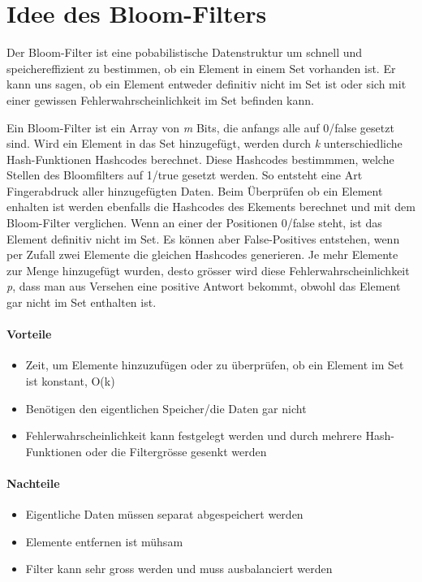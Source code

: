 \documentclass[12pt]{article}
\begin{document}
\maketitle

\section{Idee des Bloom-Filters}
Der Bloom-Filter ist eine pobabilistische Datenstruktur um schnell und speichereffizient zu bestimmen, ob ein Element in einem Set vorhanden ist. Er kann uns sagen, ob ein Element entweder definitiv nicht im Set ist oder sich mit einer gewissen Fehlerwahrscheinlichkeit im Set befinden kann.

Ein Bloom-Filter ist ein Array von \textit{m} Bits, die anfangs alle auf 0/false gesetzt sind. Wird ein Element in das Set hinzugefügt, werden durch \textit{k} unterschiedliche Hash-Funktionen Hashcodes berechnet. Diese Hashcodes bestimmmen, welche Stellen des Bloomfilters auf 1/true gesetzt werden. So entsteht eine Art Fingerabdruck aller hinzugefügten Daten. Beim Überprüfen ob ein Element enhalten ist werden ebenfalls die Hashcodes des Ekements berechnet und mit dem Bloom-Filter verglichen. Wenn an einer der Positionen 0/false steht, ist das Element definitiv nicht im Set. Es können aber False-Positives entstehen, wenn per Zufall zwei Elemente die gleichen Hashcodes generieren.  Je mehr Elemente zur Menge hinzugefügt wurden, desto grösser wird diese Fehlerwahrscheinlichkeit \textit{p}, dass man aus Versehen eine positive Antwort bekommt, obwohl das Element gar nicht im Set enthalten ist.


\paragraph{Vorteile}
\begin{itemize}
\item Zeit, um  Elemente hinzuzufügen oder zu überprüfen, ob ein Element im Set ist konstant, O(k)
\item Benötigen den eigentlichen Speicher/die Daten gar nicht
\item Fehlerwahrscheinlichkeit kann festgelegt werden und durch mehrere Hash-Funktionen oder die Filtergrösse gesenkt werden
\end{itemize}

\paragraph{Nachteile}
\begin{itemize}
\item Eigentliche Daten müssen separat abgespeichert werden
\item Elemente entfernen ist mühsam
\item Filter kann sehr gross werden und muss ausbalanciert werden
\end{itemize}
\end{document}
